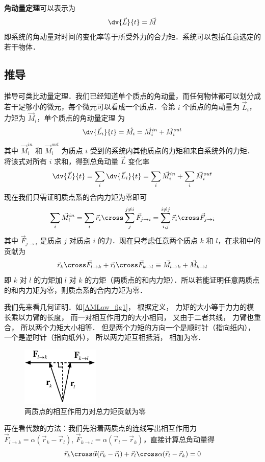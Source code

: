 

\textbf{角动量定理}可以表示为
\begin{equation}\label{AMLaw_eq1}
\dv{\vec L}{t} = \vec M
\end{equation}
即系统的角动量对时间的变化率等于所受外力的合力矩．系统可以包括任意选定的若干物体．

\subsection{推导}
推导可类比动量定理．我们已经知道单个质点的角动量，而任何物体都可以划分成若干足够小的微元，每个微元可以看成一个质点．令第 $i$ 个质点的角动量为 $\vec L_i$，力矩为 $\vec M_i$，单个质点的角动量定理 为
\begin{equation}
\dv{\vec L_i}{t} = \vec M_i = \vec M_i^{in} + \vec M_i^{out}
\end{equation}
其中 $\vec M_i^{in}$ 和 $\vec M_i^{out}$ 为质点 $i$ 受到的系统内其他质点的力矩和来自系统外的力矩．将该式对所有 $i$ 求和，得到总角动量 $\vec L$ 变化率
\begin{equation}
\dv{\vec L}{t} =\sum_i\dv{\vec L_i}{t} = \sum_i\vec M_i^{in} + \sum_i\vec M_i^{out}
\end{equation}
现在我们只需证明质点系的合内力矩为零即可
\begin{equation}
\sum_i\vec M_i^{in} = \sum_i \vec r_i\cross\sum_j^{j\ne i}\vec F_{j\to i} = \sum_{i,j}^{i\ne j} \vec r_i\cross\vec F_{j\to i}
\end{equation}
其中 $\vec F_{j\to i}$ 是质点 $j$ 对质点 $i$ 的力．现在只考虑任意两个质点 $k$ 和 $l$，在求和中的贡献为
\begin{equation}
\vec r_k\cross\vec F_{l\to k} + \vec r_l\cross\vec F_{k\to l} \equiv \vec M_{l\to k}+ \vec M_{k\to l}
\end{equation}
即 $k$ 对 $l$ 的力矩加 $l$ 对 $k$ 的力矩（两质点的和内力矩）．所以若能证明任意两质点的和内力矩为零，则质点系的合内力矩为零．

我们先来看几何证明．如\autoref{AMLaw_fig1}， 根据定义， 力矩的大小等于力力的模长乘以力臂的长度， 而一对相互作用力的大小相同， 又由于二者共线， 力臂也重合， 所以两个力矩大小相等． 但是两个力矩的方向一个是顺时针（指向纸内）， 一个是逆时针（指向纸外）， 所以两力矩互相抵消， 相加为零．

\begin{figure}[ht]
\centering
\includegraphics[width=3.7cm]{./figures/AMLaw.pdf}
\caption{两质点的相互作用力对总力矩贡献为零}\label{AMLaw_fig1}
\end{figure}

再在看代数的方法：我们先沿着两质点的连线写出相互作用力 $\vec F_{l\to k} = \alpha(\vec r_k - \vec r_l)$, $\vec F_{k\to l} = \alpha(\vec r_l - \vec r_k)$，直接计算总角动量得
\begin{equation}
\vec r_k\cross\vec \alpha(\vec r_k - \vec r_l) + \vec r_l\cross\alpha(\vec r_l - \vec r_k) = 0
\end{equation}


